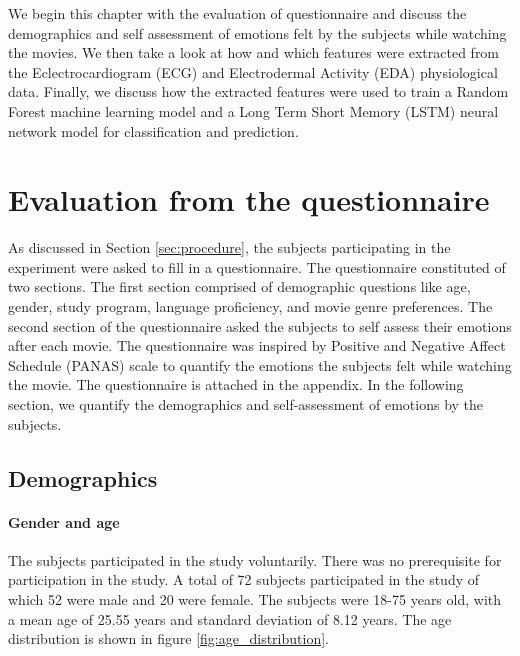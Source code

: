 We begin this chapter with the evaluation of questionnaire and discuss the demographics and self assessment of emotions felt by the subjects while watching the movies. We then take a look at how and which features were extracted from the Eclectrocardiogram (ECG) and Electrodermal Activity (EDA) physiological data. Finally, we discuss how the extracted features were used to train a Random Forest machine learning model and a Long Term Short Memory (LSTM) neural network model for classification and prediction.

\section{Evaluation from the questionnaire}
As discussed in Section \ref{sec:procedure}, the subjects participating in the experiment were asked to fill in a questionnaire. The questionnaire constituted of two sections. The first section comprised of demographic questions like age, gender, study program, language proficiency, and movie genre preferences. The second section of the questionnaire asked the subjects to self assess their emotions after each movie. The questionnaire was inspired by Positive and Negative Affect Schedule (PANAS) scale\cite{panas_crocker:1997} to quantify the emotions the subjects felt while watching the movie. The questionnaire is attached in the appendix. In the following section, we quantify the demographics and self-assessment of emotions by the subjects.
\subsection{Demographics}
\paragraph{Gender and age} The subjects participated in the study voluntarily. There was no prerequisite for participation in the study. A total of 72 subjects participated in the study of which 52 were male and 20 were female. The subjects were 18-75 years old, with a mean age of 25.55 years and standard deviation of 8.12 years. The age distribution is shown in figure \ref{fig:age_distribution}.


